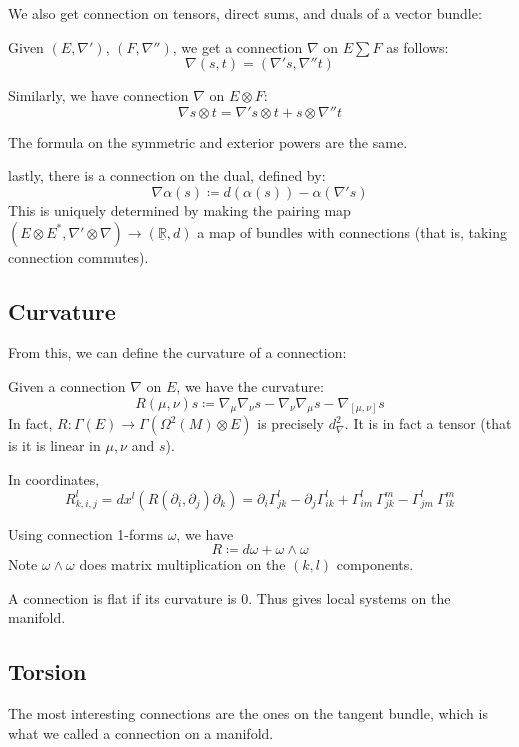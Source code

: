 \documentclass[main.tex]{subfiles}
\begin{document}
We also get connection on tensors, direct sums, and duals of a vector bundle:
\begin{construction}
Given $(E, \nabla')$, $(F, \nabla'')$, we get a connection $\nabla$ on $E \sum F$ as follows:
$$
\nabla(s, t) = (\nabla' s, \nabla'' t)
$$

Similarly, we have connection $\nabla$ on $E \otimes F$:
$$
\nabla s\otimes t = \nabla's \otimes t + s \otimes \nabla'' t
$$

The formula on the symmetric and exterior powers are the same.

lastly, there is a connection on the dual, defined by:
$$
\nabla \alpha (s) \coloneqq d (\alpha(s)) -  \alpha (\nabla' s) 
$$
This is uniquely determined by making the pairing map $(E \otimes E^*, \nabla' \otimes \nabla) \rightarrow (\underline{\mathbb{R}}, d)$ a map of bundles with connections (that is, taking connection commutes).
\end{construction}


\subsection{Curvature}

From this, we can define the curvature of a connection:

\begin{definition}
Given a connection $\nabla$ on $E$, we have the curvature:
$$
R(\mu, \nu) s  \coloneqq \nabla_{\mu} \nabla_{\nu} s - \nabla_{\nu} \nabla_{\mu} s  - \nabla_{[\mu, \nu]} s
$$
In fact, $R: \Gamma(E) \rightarrow \Gamma(\Omega^2(M) \otimes E)$ is precisely $d_\nabla ^2$. It is in fact a tensor (that is it is linear in $\mu, \nu$ and $s$).

In coordinates, 
$$
R^l _{k, i, j} = dx^l (R(\partial_i, \partial_j) \partial_k) = \partial_i \Gamma_{jk}^l - \partial_j \Gamma_{ik}^l + \Gamma_{im}^l \ \Gamma_{jk}^m   -  \Gamma_{jm}^l \  \Gamma_{ik}^m 
$$

Using connection 1-forms $\omega$, we have 
$$
R \coloneqq d\omega + \omega \wedge \omega
$$
Note $\omega \wedge \omega$ does matrix multiplication on the $(k,l)$ components. 

A connection is flat if its curvature is 0. Thus gives local systems on the manifold.
\end{definition}


\subsection{Torsion}
The most interesting connections are the ones on the tangent bundle, which is what we called a connection on a manifold.
\end{document}
